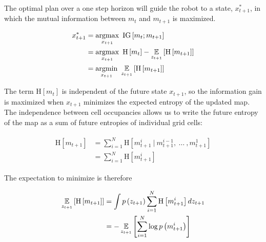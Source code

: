 \documentclass[conference]{IEEEtran}
\begin{document}
The optimal plan over a one step horizon will guide the robot to a state, $x_{t+1}^{*}$, in which the mutual information between $m_{t}$ and $m_{t+1}$ is maximized.

\begin{align} \begin{split}
    x_{t+1}^{*}
    &=
    \argmax_{x_{t+1}}
    \
    \text{IG}\left[
        m_{t}
        ;
        m_{t+1}
    \right]
    \\
    &=
    \argmax_{x_{t+1}}
    \
    \text{H}\left[
        m_{t}
    \right]
    -
    \expect_{z_{t+1}}\left[
        \text{H}\left[
            m_{t+1}
        \right]
    \right]
    \\
    &=
    \argmin_{x_{t+1}}
    \
    \expect_{z_{t+1}}\left[
        \text{H}\left[
            m_{t+1}
        \right]
    \right]
\end{split} \end{align}

The term $\text{H}\left[m_{t}\right]$ is independent of the future state $x_{t+1}$, so the information gain is maximized when $x_{t+1}$ minimizes the expected entropy of the updated map. The independence between cell occupancies allows us to write the future entropy of the map as a sum of future entropies of individual grid cells:

\begin{align} \begin{split}
    \text{H}\left[
        m_{t+1}
    \right]
    &=
    \sum_{i=1}^{N}
    \text{H}\left[
        m_{t+1}^{i}
        \ \vert \
        m_{t+1}^{i-1}
        , \
        \dots
        \ ,
        m_{t+1}^{1}
    \right]
    \\
    &=
    \sum_{i=1}^{N}
    \text{H}\left[
        m_{t+1}^{i}
    \right]
\end{split} \end{align}

The expectation to minimize is therefore

\begin{align} \begin{split}
    \expect_{z_{t+1}}\left[
        \text{H}\left[
            m_{t+1}
        \right]
    \right]
    &= 
    \int
    p\left(
        z_{t+1}
    \right)
    \sum_{i=1}^{N}
    \text{H}\left[
        m_{t+1}^{i}
    \right]
    dz_{t+1}
    \\
    &=
    -\expect_{z_{t+1}}\left[
        \sum_{i=1}^{N}
        \log p\left(
            m_{t+1}^{i}
        \right)
    \right]
\end{split} \end{align}
\end{document}
